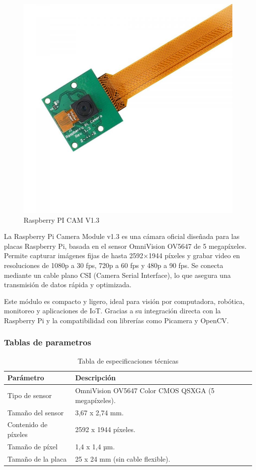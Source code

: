 \documentclass[12pt,a4paper]{article}
\begin{document}
\begin{figure}[H]
    \centering
    \includegraphics[width=0.5\linewidth]{Carpeta tecnica/berrycam.png}
    \caption{Raspberry PI CAM V1.3}
\end{figure}

La Raspberry Pi Camera Module v1.3 es una cámara oficial diseñada para las placas Raspberry Pi, basada en el sensor OmniVision OV5647 de 5 megapíxeles. Permite capturar imágenes fijas de hasta 2592×1944 píxeles y grabar video en resoluciones de 1080p a 30 fps, 720p a 60 fps y 480p a 90 fps. Se conecta mediante un cable plano CSI (Camera Serial Interface), lo que asegura una transmisión de datos rápida y optimizada.

Este módulo es compacto y ligero, ideal para visión por computadora, robótica, monitoreo y aplicaciones de IoT. Gracias a su integración directa con la Raspberry Pi y la compatibilidad con librerías como Picamera y OpenCV.

\subsubsection{Tablas de parametros}

\begin{table}[H]
\begin{tabular}{|p{4cm}|p{11cm}|}
\hline
\textbf{Parámetro} & \textbf{Descripción} \\ \hline
Tipo de sensor & OmniVision OV5647 Color CMOS QSXGA (5 megapíxeles). \\ \hline
Tamaño del sensor & 3,67 x 2,74 mm. \\ \hline
Contenido de píxeles & 2592 x 1944 píxeles. \\ \hline
Tamaño de píxel & 1,4 x 1,4 µm. \\ \hline
Tamaño de la placa & 25 x 24 mm (sin cable flexible). \\ \hline
\end{tabular}
\caption{Tabla de especificaciones técnicas}
\end{table}
\end{document}
